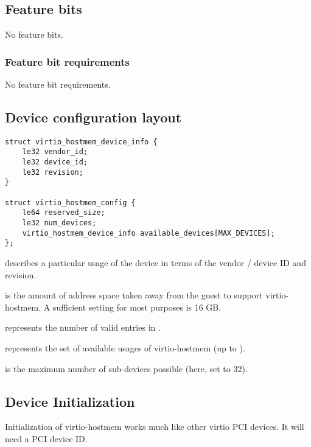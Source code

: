 \subsection{Feature bits}\label{sec: Device Types / Host Memory Device / Feature bits }

No feature bits.

\subsubsection{Feature bit requirements}\label{sec:Device Types / Host Memory Device / Feature bit requirements}

No feature bit requirements.

\subsection{Device configuration layout}\label{sec:Device Types / Host Memory Device / Device configuration layout}

\begin{lstlisting}
struct virtio_hostmem_device_info {
    le32 vendor_id;
    le32 device_id;
    le32 revision;
}

struct virtio_hostmem_config {
    le64 reserved_size;
    le32 num_devices;
    virtio_hostmem_device_info available_devices[MAX_DEVICES];
};
\end{lstlisting}

 describes a particular usage of the device
in terms of the vendor / device ID and revision.

 is the amount of address space taken away from the guest
to support virtio-hostmem.
A sufficient setting for most purposes is 16 GB.

 represents the number of valid entries in .

 represents the set of available usages of virtio-hostmem (up to ).

 is the maximum number of sub-devices possible (here, set to 32).

\subsection{Device Initialization}\label{sec:Device Types / Host Memory Device / Device Initialization}

Initialization of virtio-hostmem works much like other virtio PCI devices.
It will need a PCI device ID.

